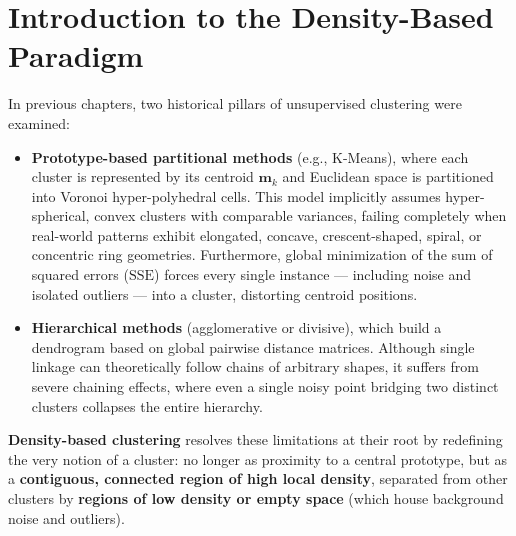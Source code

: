 \section{Introduction to the Density-Based Paradigm}
\label{sec:dm-dbscan-intro}

In previous chapters, two historical pillars of unsupervised clustering were examined:
\begin{itemize}
    \item \textbf{Prototype-based partitional methods} (e.g., K-Means), where each cluster is represented by its centroid $\mathbf{m}_k$ and Euclidean space is partitioned into Voronoi hyper-polyhedral cells. This model implicitly assumes hyper-spherical, convex clusters with comparable variances, failing completely when real-world patterns exhibit elongated, concave, crescent-shaped, spiral, or concentric ring geometries. Furthermore, global minimization of the sum of squared errors ($\mathrm{SSE}$) forces every single instance --- including noise and isolated outliers --- into a cluster, distorting centroid positions.
    \item \textbf{Hierarchical methods} (agglomerative or divisive), which build a dendrogram based on global pairwise distance matrices. Although single linkage can theoretically follow chains of arbitrary shapes, it suffers from severe chaining effects, where even a single noisy point bridging two distinct clusters collapses the entire hierarchy.
\end{itemize}

\textbf{Density-based clustering} resolves these limitations at their root by redefining the very notion of a cluster: no longer as proximity to a central prototype, but as a \textbf{contiguous, connected region of high local density}, separated from other clusters by \textbf{regions of low density or empty space} (which house background noise and outliers).

